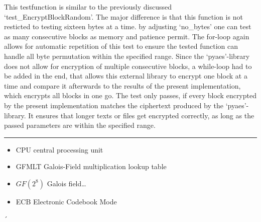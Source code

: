 This testfunction is similar to the previously discussed
`test\_EncryptBlockRandom'. The major difference is that this function
is not resticted to testing sixteen bytes at a time. by adjusting
`no\_bytes' one can test as many consecutive blocks as memory and
patience permit. The for-loop again allows for automatic repetition of
this test to ensure the tested function can handle all byte permutation
within the specified range. Since the `pyaes'-library does not allow for
encryption of multiple consecutive blocks, a while-loop had to be added
in the end, that allows this external library to encrypt one block at a
time and compare it afterwards to the results of the present
implementation, which encrypts all blocks in one go. The test only
passes, if every block encrypted by the present implementation matches
the ciphertext produced by the `pyaes'-library. It ensures that longer
texts or files get encrypted correctly, as long as the passed parameters
are within the specified range.

\begin{center}\rule{0.5\linewidth}{0.5pt}\end{center}

\begin{itemize}

\item
  CPU central processing unit
\item
  GFMLT Galois-Field multiplication lookup table
\item
  $GF(2^{8})$ Galois field\ldots{}
\item
  ECB Electronic Codebook Mode
\end{itemize}

´
